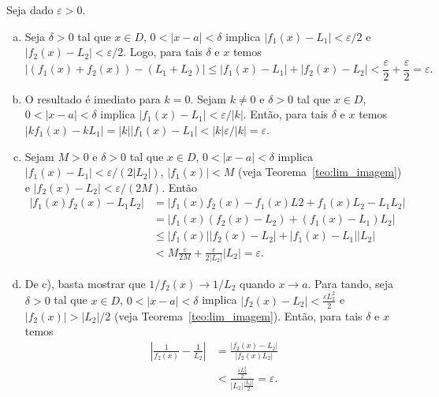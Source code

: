 \begin{dem}
  Seja dado $\varepsilon>0$.
  \begin{enumerate}[a)]
  \item Seja $\delta>0$ tal que $x\in D$, $0<|x-a|<\delta$ implica $|f_1(x)-L_1|<\varepsilon/2$ e $|f_2(x)-L_2|<\varepsilon/2$. Logo, para tais $\delta$ e $x$ temos 
    \begin{equation}
      |(f_1(x)+f_2(x)) - (L_1+L_2)| \leq |f_1(x)-L_1|+|f_2(x)-L_2| < \frac{\varepsilon}{2}+\frac{\varepsilon}{2} = \varepsilon.
\end{equation}
  \item O resultado é imediato para $k=0$. Sejam $k\neq 0$ e $\delta>0$ tal que $x\in D$, $0<|x-a|<\delta$ implica $|f_1(x)-L_1|<\varepsilon/|k|$. Então, para tais $\delta$ e $x$ temos $|kf_1(x)-kL_1| = |k||f_1(x)-L_1| < |k|\varepsilon/|k| = \varepsilon$.
  \item Sejam $M>0$ e $\delta>0$ tal que $x\in D$, $0<|x-a|<\delta$ implica $|f_1(x)-L_1| < \varepsilon/(2|L_2|)$, $|f_1(x)| < M$ (veja Teorema~\ref{teo:lim_imagem}) e $|f_2(x)-L_2| < \varepsilon/(2M)$. Então
    \begin{equation}
      \begin{split}
        |f_1(x)f_2(x)-L_1L_2| &= |f_1(x)f_2(x)-f_1(x)L2+f_1(x)L_2-L_1L_2|\\
        &= |f_1(x)(f_2(x)-L_2)+(f_1(x)-L_1)L_2|\\
        &\leq |f_1(x)||f_2(x)-L_2|+|f_1(x)-L_1||L_2|\\
        &< M\frac{\varepsilon}{2M}+\frac{\varepsilon}{2|L_2|}|L_2| = \varepsilon.
      \end{split}
    \end{equation}
  \item De c), basta mostrar que $1/f_2(x)\to 1/L_2$ quando $x\to a$. Para tando, seja $\delta>0$ tal que $x\in D$, $0<|x-a|<\delta$ implica $|f_2(x)-L_2|<\frac{\varepsilon L_2^2}{2}$ e $|f_2(x)|>|L_2|/2$ (veja Teorema~\ref{teo:lim_imagem}). Então, para tais $\delta$ e $x$ temos
    \begin{equation}
      \begin{split}
        \left|\frac{1}{f_2(x)}-\frac{1}{L_2}\right| &= \frac{|f_2(x)-L_2|}{|f_2(x)L_2|}\\
       &< \frac{\frac{\varepsilon L_2^2}{2}}{|L_2|\frac{|L_2|}{2}} = \varepsilon.
      \end{split}
    \end{equation}
  \end{enumerate}
\end{dem}


